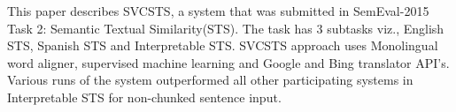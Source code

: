 This paper describes SVCSTS, a system that was submitted in SemEval-2015 Task 2: Semantic Textual Similarity(STS). The task has 3 subtasks viz., English STS, Spanish STS and Interpretable STS. SVCSTS approach uses Monolingual word aligner, supervised machine learning and Google and Bing translator API's. Various runs of the system outperformed all other participating systems in Interpretable STS for non-chunked sentence input.
